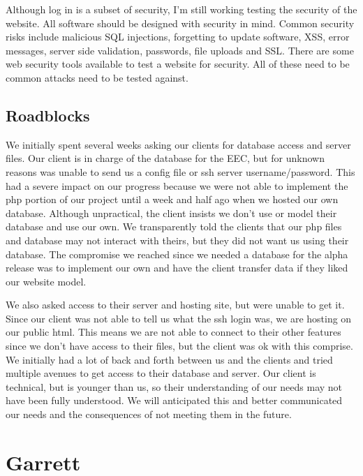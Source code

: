 \documentclass[letterpaper,10pt,titlepage,journal,compsoc,draftclsnofoot,onecolumn]{IEEEtran}
\newcommand\tab[1][1cm]{\hspace*{#1}}
\begin{document}
\tab
Although log in is a subset of security, I’m still working testing the security of the website. All software should be designed with security in mind. Common security risks include malicious SQL injections, forgetting to update software, XSS, error messages, server side validation, passwords, file uploads and SSL. There are some web security tools available to test a website for security. All of these need to be common attacks need to be tested against.
\newline


\subsection{Roadblocks}

\tab
We initially spent several weeks asking our clients for database access and server files. Our client is in charge of the database for the EEC, but for unknown reasons was unable to send us a config file or ssh server username/password. This had a severe impact on our progress because we were not able to implement the php portion of our project until a week and half ago when we hosted our own database. Although unpractical, the client insists we don’t use or model their database and use our own. We transparently told the clients that our php files and database may not interact with theirs, but they did not want us using their database. The compromise we reached since we needed a database for the alpha release was to implement our own and have the client transfer data if they liked our website model. 
\newline

\tab
We also asked access to their server and hosting site, but were unable to get it. Since our client was not able to tell us what the ssh login was, we are hosting on our public html. This means we are not able to connect to their other features since we don’t have access to their files, but the client was ok with this comprise. We initially had a lot of back and forth between us and the clients and tried multiple avenues to get access to their database and server. Our client is technical, but is younger than us, so their understanding of our needs may not have been fully understood. We will anticipated this and better communicated our needs and the consequences of not meeting them in the future.
\newline



\section{Garrett}
\end{document}
